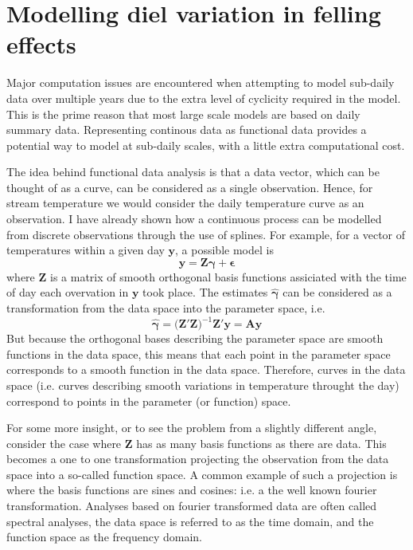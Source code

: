 \section{Modelling diel variation in felling effects}

Major computation issues are encountered when attempting to model sub-daily data over multiple years due to the extra level of cyclicity required in the model.  This is the prime reason that most large scale models are based on daily summary data.  Representing continous data as functional data provides a potential way to model at sub-daily scales, with a little extra computational cost.

The idea behind functional data analysis is that a data vector, which can be thought of as a curve, can be considered as a single observation.  Hence, for stream temperature we would consider the daily temperature curve as an observation.  I have already shown how a continuous process can be modelled from discrete observations through the use of splines.  For example, for a vector of temperatures within a given day $\bm{y}$, a possible model is
\begin{equation}
   \bm{y} = \bm{Z} \bm{\gamma} + \bm{\epsilon}
\end{equation}
where $\bm{Z}$ is a matrix of smooth orthogonal basis functions assiciated with the time of day each overvation in $\bm{y}$ took place.  The estimates $\hat{\bm{\gamma}}$ can be considered as a transformation from the data space into the parameter space, i.e.
\begin{equation}
   \hat{\bm{\gamma}} = \Big(\bm{Z}'\bm{Z}\Big)^{-1} \bm{Z}' \bm{y} = \bm{A} \bm{y}
\end{equation}
But because the orthogonal bases describing the parameter space are smooth functions in the data space, this means that each point in the parameter space corresponds to a smooth function in the data space.  Therefore, curves in the data space (i.e. curves describing smooth variations in temperature throught the day) correspond to points in the parameter (or function) space.

For some more insight, or to see the problem from a slightly different angle, consider the case where $\bm{Z}$ has as many basis functions as there are data.  This becomes a one to one transformation projecting the observation from the data space into a so-called function space.  A common example of such a projection is where the basis functions are sines and cosines: i.e. a the well known fourier transformation.  Analyses based on fourier transformed data are often called spectral analyses, the data space is referred to as the time domain, and the function space as the frequency domain.  

